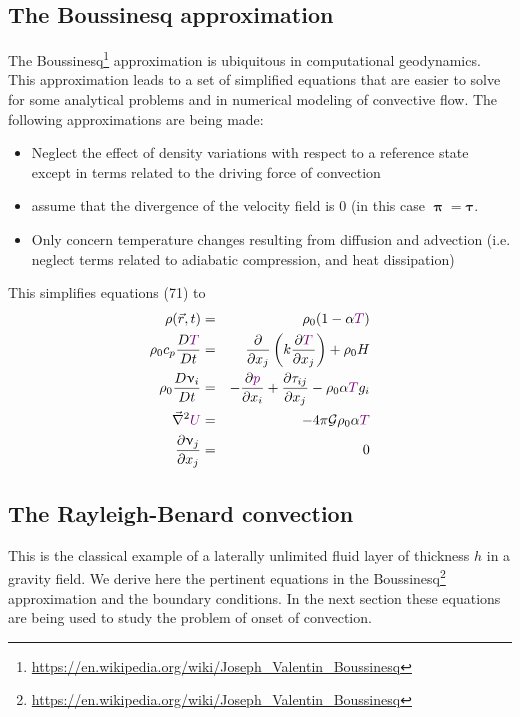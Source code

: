 \subsection{The Boussinesq approximation}

The Boussinesq\footnote{\url{https://en.wikipedia.org/wiki/Joseph_Valentin_Boussinesq}} 
approximation is ubiquitous in computational geodynamics.
This approximation leads to a set of simplified equations that are easier to solve for some
analytical problems and in numerical modeling of convective flow. The following
approximations are being made:
\begin{itemize}
\item Neglect the effect of density variations with respect to a reference state except in terms
related to the driving force of convection
\item assume that the divergence of the velocity field is 0 (in this case ${\bm \uppi}={\bm \tau}$.
\item Only concern temperature changes resulting from diffusion and advection (i.e. neglect
terms related to adiabatic compression, and heat dissipation)
\end{itemize}

This simplifies equations (71) to
\begin{eqnarray}
\rho(\vec{r},t) &=& \rho_0 (1-\alpha {\color{violet}T}) \\
\rho_0 c_p \frac{D {\color{violet}T} }{Dt} &=& \frac{\partial}{\partial x_j}
\left( k \frac{\partial {\color{violet}T}}{\partial x_j}  \right) + \rho_0 H \\
\rho_0 \frac{D\upnu_i}{Dt} &=& -\frac{\partial {\color{violet} p}}{\partial x_i}
+\frac{\partial \tau_{ij}}{\partial x_j} - \rho_0 \alpha {\color{violet}T} g_i \\
\vec\nabla^2 {\color{violet}U} &=& -4 \pi {\cal G} \rho_0 \alpha {\color{violet}T} \\
\frac{\partial \upnu_j}{\partial x_j} &=& 0
\end{eqnarray}

\subsection{The Rayleigh-Benard convection}

This is the classical example of a laterally unlimited fluid layer of thickness $h$ in a gravity
field. We derive here the pertinent equations in the Boussinesq\footnote{
\url{https://en.wikipedia.org/wiki/Joseph_Valentin_Boussinesq}} approximation and the
boundary conditions. In the next section these equations are being used to study the
problem of onset of convection.

